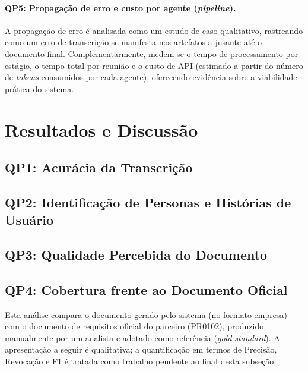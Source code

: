 \paragraph{QP5: Propagação de erro e custo por agente (\textit{pipeline}).}
A propagação de erro é analisada como um estudo de caso qualitativo, rastreando como um erro de transcrição se manifesta nos artefatos a jusante até o documento final. Complementarmente, medem-se o tempo de processamento por estágio, o tempo total por reunião e o custo de API (estimado a partir do número de \textit{tokens} consumidos por cada agente), oferecendo evidência sobre a viabilidade prática do sistema.

\section{Resultados e Discussão}
\label{sec:resultados}


\subsection{QP1: Acurácia da Transcrição}

\subsection{QP2: Identificação de Personas e Histórias de Usuário}

\subsection{QP3: Qualidade Percebida do Documento}

\subsection{QP4: Cobertura frente ao Documento Oficial}

Esta análise compara o documento gerado pelo sistema (no formato empresa) com o documento de requisitos oficial do parceiro (PR0102), produzido manualmente por um analista e adotado como referência (\textit{gold standard}). A apresentação a seguir é qualitativa; a quantificação em termos de Precisão, Revocação e F1 é tratada como trabalho pendente ao final desta subseção.

